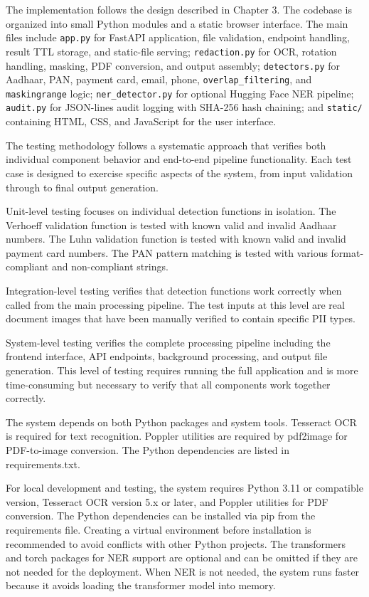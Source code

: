 The implementation follows the design described in Chapter 3. The codebase is organized into small Python modules and a static browser interface. The main files include \texttt{app.py} for FastAPI application, file validation, endpoint handling, result TTL storage, and static-file serving; \texttt{redaction.py} for OCR, rotation handling, masking, PDF conversion, and output assembly; \texttt{detectors.py} for Aadhaar, PAN, payment card, email, phone, \texttt{overlap\_filtering}, and \texttt{masking\-range} logic; \texttt{ner\_detector.py} for optional Hugging Face NER pipeline; \texttt{audit.py} for JSON-lines audit logging with SHA-256 hash chaining; and \texttt{static/} containing HTML, CSS, and JavaScript for the user interface.

\bigskip

The testing methodology follows a systematic approach that verifies both individual component behavior and end-to-end pipeline functionality. Each test case is designed to exercise specific aspects of the system, from input validation through to final output generation.

Unit-level testing focuses on individual detection functions in isolation. The Verhoeff validation function is tested with known valid and invalid Aadhaar numbers. The Luhn validation function is tested with known valid and invalid payment card numbers. The PAN pattern matching is tested with various format-compliant and non-compliant strings.

Integration-level testing verifies that detection functions work correctly when called from the main processing pipeline. The test inputs at this level are real document images that have been manually verified to contain specific PII types.

System-level testing verifies the complete processing pipeline including the frontend interface, API endpoints, background processing, and output file generation. This level of testing requires running the full application and is more time-consuming but necessary to verify that all components work together correctly.

\bigskip

The system depends on both Python packages and system tools. Tesseract OCR is required for text recognition. Poppler utilities are required by pdf2image for PDF-to-image conversion. The Python dependencies are listed in requirements.txt.

For local development and testing, the system requires Python 3.11 or compatible version, Tesseract OCR version 5.x or later, and Poppler utilities for PDF conversion. The Python dependencies can be installed via pip from the requirements file. Creating a virtual environment before installation is recommended to avoid conflicts with other Python projects. The transformers and torch packages for NER support are optional and can be omitted if they are not needed for the deployment. When NER is not needed, the system runs faster because it avoids loading the transformer model into memory.

